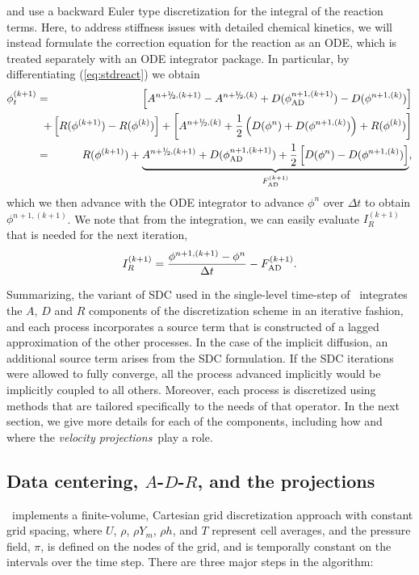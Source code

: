 and use a backward Euler type discretization for the integral of the reaction terms.
Here, to address stiffness issues with detailed chemical kinetics, we will instead
formulate the correction equation for the 
reaction as an ODE, which is treated separately with an ODE integrator package.
In particular, by differentiating (\ref{eq:stdreact}) we obtain
\begin{eqnarray}
{\phi}^{(k+1)}_t &=& \left[ A^{n+\myhalf,(k+1)} - A^{n+\myhalf,(k)} + D(\phi_{\rm AD}^{n+1,(k+1)}) - D(\phi^{n+1,(k)}) \right]\nonumber\\
&&\hspace{-0.5cm}+ \left[R(\phi^{(k+1)}) - R(\phi^{(k)})\right] + \left[A^{n+\myhalf,(k)} + \half\left(D(\phi^n) + D(\phi^{n+1,(k)})\right) + R(\phi^{(k)})\right]\nonumber\\
&=& R(\phi^{(k+1)}) + \underbrace{A^{n+\myhalf,(k+1)} + D(\phi_{\rm AD}^{n+1,(k+1)}) + \half\left[D(\phi^n) - D(\phi^{n+1,(k)})\right]}_{F_{\rm AD}^{(k+1)}}, \label{eq:MISDCint}
\end{eqnarray}
which we then advance with the ODE integrator to advance $\phi^n$ over $\Delta t$ to obtain $\phi^{n+1,(k+1)}$.
We note that from the integration, we can easily evaluate
$I_R^{(k+1)}$ that is needed for the next iteration,
\begin{equation}
I_R^{(k+1)} = \frac{\phi^{n+1,(k+1)} - \phi^n}{\Delta t} - F_{\rm AD}^{(k+1)}.
\end{equation}

Summarizing, the variant of SDC used in the single-level time-step of \pelelm\ integrates the $A$, $D$ and $R$ components of the discretization scheme in an iterative fashion, and each process incorporates a source term that is constructed of a lagged approximation of the other processes. In the case of the implicit diffusion, an additional source term arises from the SDC formulation.  If the SDC iterations were allowed to fully converge, all the process advanced implicitly would be implicitly coupled to all others.  Moreover, each process is discretized using methods that are tailored specifically to the needs of that operator. In the next section, we give more details for each of the components, including how and where the \textit{velocity projections}\ play a role.


\subsection{Data centering, $A$-$D$-$R$, and the projections}
\pelelm\ implements a finite-volume, Cartesian grid discretization approach with constant grid spacing, where
$U$, $\rho$, $\rho Y_m$, $\rho h$, and $T$ represent cell averages, and the pressure field, $\pi$, is defined on the nodes
of the grid, and is temporally constant on the intervals over the time step. There are three major steps in the algorithm:\\

